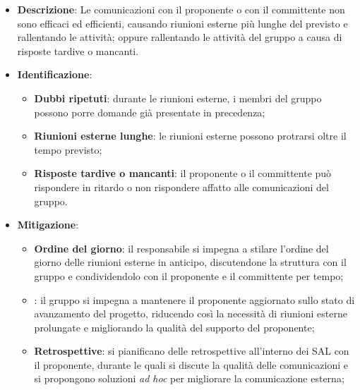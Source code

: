 \label{risk:comunicazione esterna carente}
\begin{itemize}
	\item \textbf{Descrizione}:
	      Le comunicazioni con il proponente o con il committente non sono
	      efficaci ed efficienti, causando riunioni esterne più lunghe del
	      previsto e rallentando le attività; oppure rallentando le attività
	      del gruppo a causa di risposte tardive o mancanti.

	\item \textbf{Identificazione}:
	      \begin{itemize}
		      \item \textbf{Dubbi ripetuti}: durante le riunioni esterne, i
		            membri del gruppo possono porre domande già presentate in
		            precedenza;

		      \item \textbf{Riunioni esterne lunghe}: le riunioni esterne
		            possono protrarsi oltre il tempo previsto;

		      \item \textbf{Risposte tardive o mancanti}: il proponente o il
		            committente può rispondere in ritardo o non rispondere
		            affatto alle comunicazioni del gruppo.
	      \end{itemize}

	\item \textbf{Mitigazione}:
	      \begin{itemize}
		      \item \textbf{Ordine del giorno}: il responsabile si impegna a
		            stilare l'ordine del giorno delle riunioni esterne in anticipo, 
					discutendone la struttura con il gruppo e condividendolo con il 
					proponente e il committente per tempo;

		      \item \textbf{}: il gruppo si impegna a mantenere il
		            proponente aggiornato sullo stato di avanzamento del
		            progetto, riducendo così la necessità di riunioni esterne 
					prolungate e migliorando la qualità del supporto del proponente;

		      \item \textbf{Retrospettive}: si pianificano delle retrospettive all'interno 
			  		dei SAL con il proponente, durante le quali si discute la qualità 
					delle comunicazioni e si propongono soluzioni \textit{ad hoc} per migliorare 
					la comunicazione esterna;


\end{itemize}
\end{itemize}
